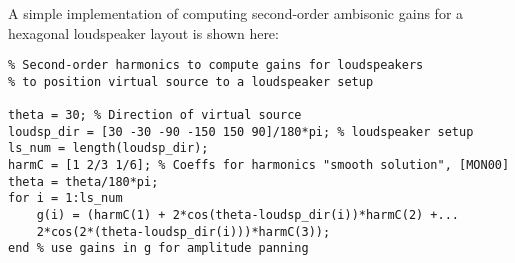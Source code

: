 \documentclass[10pt,a4paper,oneside]{article}
\begin{document}
A simple implementation of computing second-order ambisonic gains for a hexagonal loudspeaker layout is shown here:
\begin{lstlisting}
% Second-order harmonics to compute gains for loudspeakers
% to position virtual source to a loudspeaker setup

theta = 30; % Direction of virtual source
loudsp_dir = [30 -30 -90 -150 150 90]/180*pi; % loudspeaker setup 
ls_num = length(loudsp_dir);
harmC = [1 2/3 1/6]; % Coeffs for harmonics "smooth solution", [MON00]
theta = theta/180*pi;
for i = 1:ls_num
	g(i) = (harmC(1) + 2*cos(theta-loudsp_dir(i))*harmC(2) +...
	2*cos(2*(theta-loudsp_dir(i)))*harmC(3));
end % use gains in g for amplitude panning 

\end{lstlisting}
\end{document}
